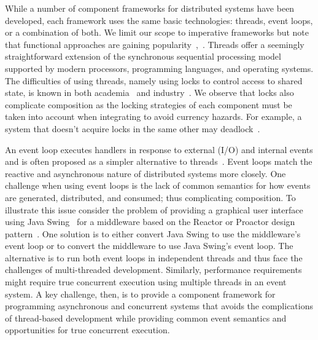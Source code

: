 While a number of component frameworks for distributed systems have been developed, each framework uses the same basic technologies:  threads, event loops, or a combination of both.
We limit our scope to imperative frameworks but note that functional approaches are gaining popularity~\cite{armstrong1996concurrent},~\cite{halloway2009programming}.
Threads offer a seemingly straightforward extension of the synchronous sequential processing model supported by modern processors, programming languages, and operating systems.
The difficulties of using threads, namely using locks to control access to shared state, is known in both academia~\cite{lee2006problem} and industry~\cite{sutter2005free}.
We observe that locks also complicate composition as the locking strategies of each component must be taken into account when integrating to avoid currency hazards.
For example, a system that doesn't acquire locks in the same other may deadlock~\cite{havender1968avoiding}.

An event loop executes handlers in response to external (I/O) and internal events and is often proposed as a simpler alternative to threads~\cite{ousterhout1996threads}.
Event loops match the reactive and asynchronous nature of distributed systems more closely.
One challenge when using event loops is the lack of common semantics for how events are generated, distributed, and consumed; thus complicating composition.
To illustrate this issue consider the problem of providing a graphical user interface using Java Swing~\cite{eckstein1998java} for a middleware based on the Reactor or Proactor design pattern~\cite{schmidt2000pattern}.
One solution is to either convert Java Swing to use the middleware's event loop or to convert the middleware to use Java Swing's event loop.
The alternative is to run both event loops in independent threads and thus face the challenges of multi-threaded development.
Similarly, performance requirements might require true concurrent execution using multiple threads in an event system.
A key challenge, then, is to provide a component framework for programming asynchronous and concurrent systems that avoids the complications of thread-based development while providing common event semantics and opportunities for true concurrent execution.

